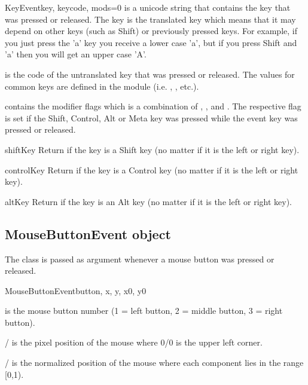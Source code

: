 \begin{classdesc}{KeyEvent}{key, keycode, mods=0}
 is a unicode string that contains the key that was 
pressed or released. The key is the translated key which means
that it may depend on other keys (such as Shift) or previously pressed
keys. For example, if you just press the 'a' key you receive a lower
case 'a', but if you press Shift and 'a' then you will get an upper
case 'A'.

 is the code of the untranslated key that was pressed
or released. The values for common keys are defined in the 
module (i.e. , , etc.).

 contains the modifier flags which is a combination of
, ,  and
. The respective flag is set if the Shift, Control,
Alt or Meta key was pressed while the event key was pressed or released.
\end{classdesc}

\begin{methoddesc}{shiftKey}{}
Return  if the key is a Shift key (no matter if it is the
left or right key).
\end{methoddesc}

\begin{methoddesc}{controlKey}{}
Return  if the key is a Control key (no matter if it is the
left or right key).
\end{methoddesc}

\begin{methoddesc}{altKey}{}
Return  if the key is an Alt key (no matter if it is the
left or right key).
\end{methoddesc}

\subsection{MouseButtonEvent object}

The  class is passed as argument whenever
a mouse button was pressed or released.

\begin{classdesc}{MouseButtonEvent}{button, x, y, x0, y0}

 is the mouse button number (1 = left button, 2 = middle button,
3 = right button).

/ is the pixel position of the mouse where 0/0 is the upper
left corner.

/ is the normalized position of the mouse where each 
component lies in the range [0,1).

\end{classdesc}

